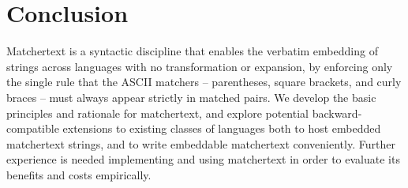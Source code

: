 \section{Conclusion}
\label{sec:concl}

Matchertext is a syntactic discipline
that enables the verbatim embedding of strings across languages
with no transformation or expansion,
by enforcing only the single rule that the ASCII matchers --
parentheses, square brackets, and curly braces --
must always appear strictly in matched pairs.
We develop the basic principles and rationale for matchertext,
and explore potential backward-compatible extensions
to existing classes of languages
both to host embedded matchertext strings,
and to write embeddable matchertext conveniently.
Further experience is needed implementing and using matchertext
in order to evaluate its benefits and costs empirically.



